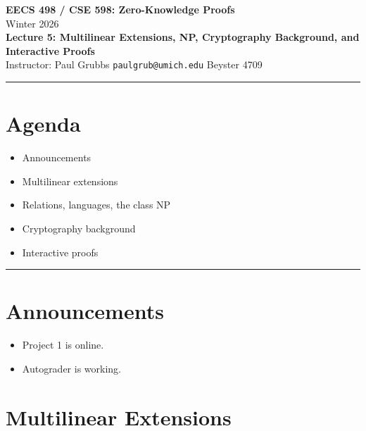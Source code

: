\documentclass[11pt]{article}
\begin{document}
\begin{center}
  {\LARGE \textbf{EECS 498 / CSE 598: Zero-Knowledge Proofs}}\\[6pt]
  {\large Winter 2026}\\[4pt]
  {\large \textbf{Lecture 5: Multilinear Extensions, NP, Cryptography Background, and Interactive Proofs}}\\[4pt]
  {\large Instructor: Paul Grubbs \quad \texttt{paulgrub@umich.edu} \quad Beyster 4709}
\end{center}

\hrule
\vspace{1em}

\section*{Agenda}
\begin{itemize}[leftmargin=2em]
  \item Announcements
  \item Multilinear extensions
  \item Relations, languages, the class NP
  \item Cryptography background
  \item Interactive proofs
\end{itemize}

\hrule
\vspace{1em}

\section{Announcements}
\begin{itemize}[leftmargin=2em]
  \item Project 1 is online.
  \item Autograder is working.
\end{itemize}

\section{Multilinear Extensions}
\end{document}
